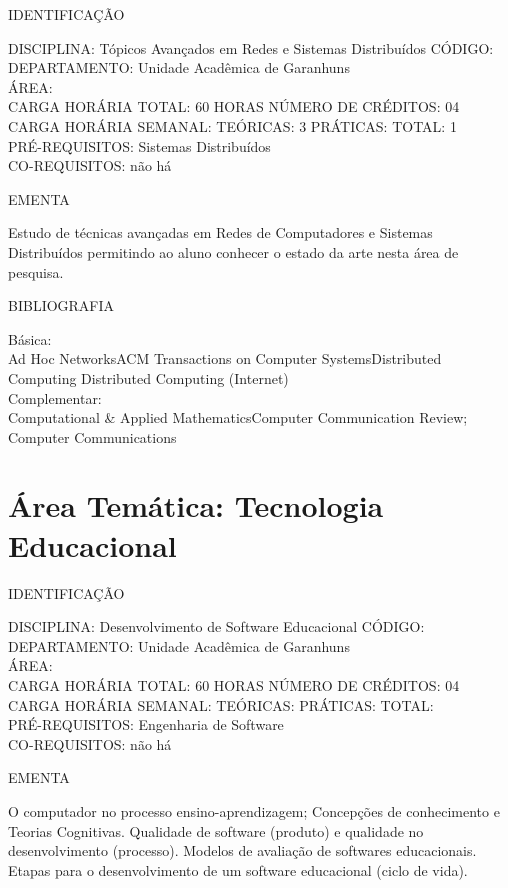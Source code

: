 \documentclass[
	12pt,				%
	openright,			%
  oneside,     %
	a4paper,			%
	english,			%
	french,				%
	spanish,			%
	brazil				%
	]{abntex2}
\begin{document}
\begin{apendicesenv}
\newpage IDENTIFICAÇÃO

DISCIPLINA: Tópicos Avançados em Redes e Sistemas Distribuídos CÓDIGO:\\ 
DEPARTAMENTO: Unidade Acadêmica de Garanhuns\\ 
ÁREA: \\ 
CARGA HORÁRIA TOTAL: 60 HORAS NÚMERO DE CRÉDITOS: 04\\
CARGA HORÁRIA SEMANAL: TEÓRICAS: 3 PRÁTICAS: TOTAL: 1 \\
PRÉ-REQUISITOS: Sistemas Distribuídos\\
CO-REQUISITOS: não há

EMENTA 

Estudo de técnicas avançadas em Redes de Computadores e Sistemas
Distribuídos permitindo ao aluno conhecer o estado da arte nesta área
de pesquisa.

BIBLIOGRAFIA 

Básica:\\
Ad Hoc NetworksACM Transactions on Computer SystemsDistributed
Computing Distributed Computing (Internet)\\
Complementar:\\
Computational \& Applied MathematicsComputer Communication Review;
Computer Communications\\
\newpage 

\section*{Área Temática: Tecnologia Educacional}

IDENTIFICAÇÃO

DISCIPLINA: Desenvolvimento de Software Educacional CÓDIGO:\\
DEPARTAMENTO: Unidade Acadêmica de Garanhuns\\
ÁREA: \\
CARGA HORÁRIA TOTAL: 60 HORAS NÚMERO DE CRÉDITOS: 04\\
CARGA HORÁRIA SEMANAL: TEÓRICAS: PRÁTICAS: TOTAL: \\
PRÉ-REQUISITOS: Engenharia de Software\\
CO-REQUISITOS: não há

EMENTA 

O computador no processo ensino-aprendizagem; Concepções de
conhecimento e Teorias Cognitivas. Qualidade de software
(produto) e qualidade no desenvolvimento (processo). Modelos de
avaliação de softwares educacionais. Etapas para o
desenvolvimento de um software educacional (ciclo de vida).


\end{apendicesenv}
\end{document}
